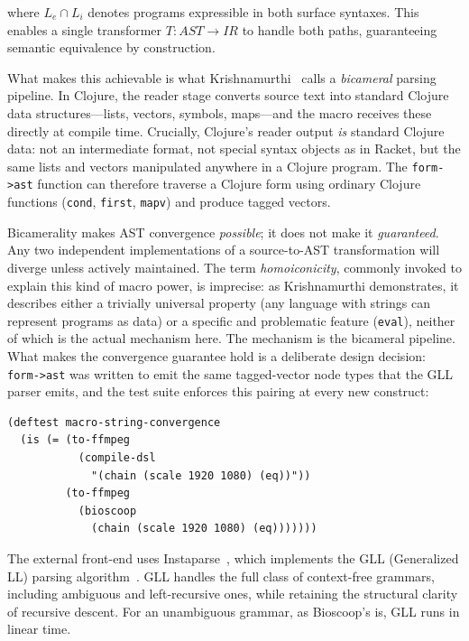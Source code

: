 \documentclass[english,submission]{programming}
\begin{document}
where $L_e \cap L_i$ denotes programs expressible in both surface syntaxes. This enables a single transformer $T : AST \rightarrow IR$ to handle both paths, guaranteeing semantic equivalence by construction.

What makes this achievable is what Krishnamurthi~\cite{krishnamurthi} calls a \emph{bicameral} parsing pipeline. In Clojure, the reader stage converts source text into standard Clojure data structures---lists, vectors, symbols, maps---and the macro receives these directly at compile time. Crucially, Clojure's reader output \emph{is} standard Clojure data: not an intermediate format, not special syntax objects as in Racket, but the same lists and vectors manipulated anywhere in a Clojure program. The \texttt{form->ast} function can therefore traverse a Clojure form using ordinary Clojure functions (\texttt{cond}, \texttt{first}, \texttt{mapv}) and produce tagged vectors.

Bicamerality makes AST convergence \emph{possible}; it does not make it \emph{guaranteed}. Any two independent implementations of a source-to-AST transformation will diverge unless actively maintained. The term \emph{homoiconicity}, commonly invoked to explain this kind of macro power, is imprecise: as Krishnamurthi demonstrates, it describes either a trivially universal property (any language with strings can represent programs as data) or a specific and problematic feature (\texttt{eval}), neither of which is the actual mechanism here. The mechanism is the bicameral pipeline. What makes the convergence guarantee hold is a deliberate design decision: \texttt{form->ast} was written to emit the same tagged-vector node types that the GLL parser emits, and the test suite enforces this pairing at every new construct:

\begin{lstlisting}[caption={Convergence test pattern}]
(deftest macro-string-convergence
  (is (= (to-ffmpeg
           (compile-dsl
             "(chain (scale 1920 1080) (eq))"))
         (to-ffmpeg
           (bioscoop
             (chain (scale 1920 1080) (eq)))))))
\end{lstlisting}

The external front-end uses Instaparse~\cite{instaparse}, which implements the GLL (Generalized LL) parsing algorithm~\cite{gll}. GLL handles the full class of context-free grammars, including ambiguous and left-recursive ones, while retaining the structural clarity of recursive descent. For an unambiguous grammar, as Bioscoop's is, GLL runs in linear time.
\end{document}
